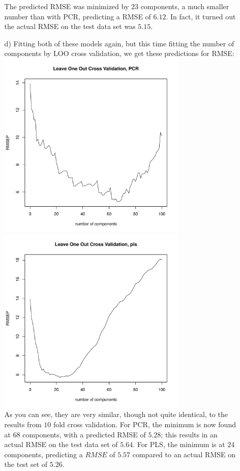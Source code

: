 \documentclass[11pt]{article}
\theoremstyle{definition}
\begin{document}
\begin{itemize}
\begin{itemize}
                The predicted RMSE was minimized by $23$ components, a much smaller number than with PCR, predicting a RMSE of $6.12$. In fact, it turned out the actual RMSE on the test data set was $5.15$.
            \item[d)]
                Fitting both of these models again, but this time fitting the number of components by LOO cross validation, we get these predictions for RMSE: \\
                \includegraphics[width=9cm]{final/3d_pcr_loo} 
                \includegraphics[width=9cm]{final/3d_pls_loo} \\ 
                As you can see, they are very similar, though not quite identical, to the results from $10$ fold cross validation. For PCR, the minimum is now found at $68$ components, with a predicted RMSE of $5.28$; this results in an actual RMSE on the test data set of $5.64$. For PLS, the minimum is at $24$ components, predicting a $RMSE$ of $5.57$ compared to an actual RMSE on the test set of $5.26$. \par

\end{itemize}
\end{itemize}
\end{document}
